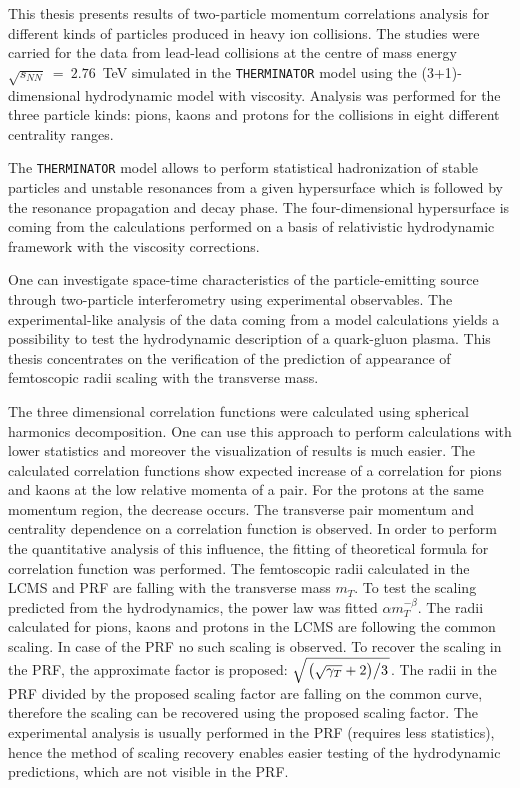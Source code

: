 This thesis presents results of two-particle momentum correlations analysis for different kinds of particles produced in heavy ion collisions.
The studies were carried for the data from lead-lead collisions at the centre of mass energy $\sqrt{s_{NN}}~=~2.76$~TeV simulated in the \verb|THERMINATOR| model using the (3+1)-dimensional hydrodynamic model with viscosity.
Analysis was performed for the three particle kinds: pions, kaons and protons for the collisions in eight different centrality ranges.

The \verb|THERMINATOR| model allows to perform statistical hadronization of stable particles and unstable resonances from a given hypersurface which is followed by the resonance propagation and decay phase.
The four-dimensional hypersurface is coming from the calculations performed on a basis of relativistic hydrodynamic framework with the viscosity corrections.

One can investigate space-time characteristics of the particle-emitting source through two-particle interferometry using experimental observables.
The experimental-like analysis of the data coming from a model calculations yields a possibility to test the hydrodynamic description of a quark-gluon plasma.
This thesis concentrates on the verification of the prediction of appearance of femtoscopic radii scaling with the transverse mass.

The three dimensional correlation functions were calculated using spherical harmonics decomposition.
One can use this approach to perform calculations with lower statistics and moreover the visualization of results is much easier.
The calculated correlation functions show expected increase of a correlation for pions and kaons at the low relative momenta of a pair.
For the protons at the same momentum region, the decrease occurs.
The transverse pair momentum and centrality dependence on a correlation function is observed.
In order to perform the quantitative analysis of this influence, the fitting of theoretical formula for correlation function was performed.
The femtoscopic radii calculated in the LCMS and PRF are falling with the transverse mass $m_T$.
To test the scaling predicted from the hydrodynamics, the power law was fitted $\alpha m_T^{-\beta}$.
The radii calculated for pions, kaons and protons in the LCMS are following the common scaling.
In case of the PRF no such scaling is observed.
To recover the scaling in the PRF, the approximate factor is proposed: $\sqrt{ \left. \left( \sqrt{\gamma_T} + 2 \right) \middle/ 3 \right. }$.
The radii in the PRF divided by the proposed scaling factor are falling on the common curve, therefore the scaling can be recovered using the proposed scaling factor.
The experimental analysis is usually performed in the PRF (requires less statistics), hence the method of scaling recovery enables easier testing of the hydrodynamic predictions, which are not visible in the PRF.
